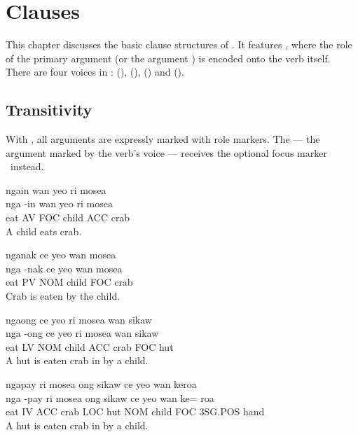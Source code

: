 \chapter{Clauses}
\label{ch:clauses}
This chapter discusses the basic clause structures of \langname{}.
It features , where the role of the primary argument
(or the argument ) is encoded onto the verb itself. There are four voices in
\langname{}:  (\AV),  (\PV),  (\LV)
and  (\IV).

\section{Transitivity}
With , all arguments are expressly marked with role markers.
The  --- the argument marked by the verb's voice --- receives the optional focus marker
\FOC~instead.
\begin{examples}
	\ex
	\label{ex:actor_voice}
	\script ngain wan yeo ri mosea \\
	\bits nga -in wan yeo ri mosea \\
	\gloss eat AV FOC child ACC crab \\
	\tr A child eats crab.
\end{examples}

\begin{examples}
	\ex
	\label{ex:patient_voice}
	\script nganak ce yeo wan mosea \\
	\bits nga -nak ce yeo wan mosea \\
	\gloss eat PV NOM child FOC crab \\
	\tr Crab is eaten by the child.
\end{examples}

\begin{examples}
	\ex
	\label{ex:locative_voice}
	\script ngaong ce yeo ri mosea wan sikaw \\
	\bits nga -ong ce yeo ri mosea wan sikaw \\
	\gloss eat LV NOM child ACC crab FOC hut \\
	\tr A hut is eaten crab in by a child.
\end{examples}

\begin{examples}
	\ex
	\label{ex:instrumental_voice}
	\script ngapay ri mosea ong sikaw ce yeo wan keroa \\
	\bits nga -pay ri mosea ong sikaw ce yeo wan ke= roa \\
	\gloss eat IV ACC crab LOC hut NOM child FOC 3SG.POS hand \\
	\tr A hut is eaten crab in by a child.
\end{examples}

